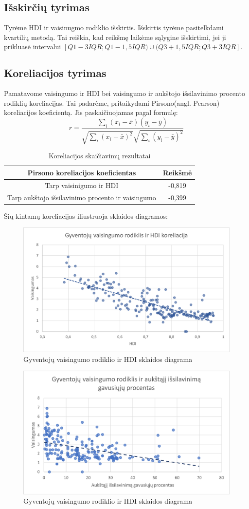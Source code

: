 \subsection{Išskirčių tyrimas}
Tyrėme HDI ir vaisinugmo rodiklio išskirtis.
Išskirtis tyrėme pasitelkdami kvartilių metodą. Tai reiškia, kad reikšmę laikėme sąlygine išskirtimi, jei ji prikluasė intervalui $[Q1-3IQR; Q1-1,5IQR) \cup (Q3+1,5IQR; Q3+3IQR]$.

\subsection{Koreliacijos tyrimas}
Pamatavome vaisingumo ir HDI bei vaisingumo ir aukštojo išsilavinimo procento rodiklių koreliacijas. Tai padarėme, pritaikydami Pirsono(angl. Pearson) koreliacijos koeficientą. Jis paskaičiuojamas pagal formulę: 
\begin{equation}
r = \frac{\sum\limits_i (x_i - \bar{x})(y_i - \bar{y})}{\sqrt{\sum\limits_i(x_i - \bar{x})^2}\sqrt{\sum\limits_i(y_i - \bar{y})^2}}
\end{equation}

\begin{table}[h!]
\begin{center}
    \begin{tabular}{|c|c|}
        \hline
        \textbf{Pirsono koreliacijos koeficientas} & \textbf{Reikšmė} \\\hline
        Tarp vaisinigumo ir HDI & -0,819 \\\hline
        Tarp aukštojo išsilavinimo procento ir vaisingumo & -0,399 \\\hline
    \end{tabular}
    \caption{Koreliacijos skaičiavimų rezultatai}
\end{center}
\end{table}

Šių kintamų koreliacijas iliustruoja sklaidos diagramos:
\begin{figure}[h]
    \centering
    \includegraphics[width=.5\textwidth]{pic/vias_hdi_rod.png}
    \caption{Gyventojų vaisingumo rodiklio ir HDI sklaidos diagrama}
\end{figure}
\begin{figure}[h!]
    \centering
    \includegraphics[width=.5\textwidth]{pic/gyv_vais_kor.png}
    \caption{Gyventojų vaisingumo rodiklio ir HDI sklaidos diagrama}
\end{figure}
